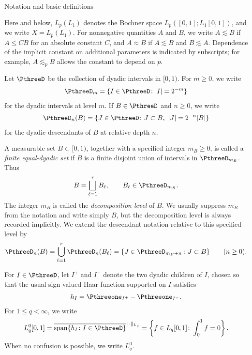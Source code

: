 \documentclass[11pt,reqno]{amsart}
\makeatletter
\theoremstyle{plain}
\theoremstyle{definition}
\newcounter{problempaper}
\newenvironment{problempaperbody}{%
  \setcounter{subsection}{0}%
  \setcounter{subsubsection}{0}%
  \setcounter{paragraph}{0}%
  \renewcommand{\thesubsection}{\arabic{subsection}}%
  \renewcommand{\thesubsubsection}{\thesubsection.\arabic{subsubsection}}%
  \renewcommand{\theparagraph}{\thesubsubsection.\arabic{paragraph}}%
  \let\problem@outersection\section
  \let\problem@outersubsection\subsection
  \let\problem@outersubsubsection\subsubsection
  \let\problem@outerparagraph\paragraph
  \let\section\problem@papersection
  \let\subsection\problem@papersubsection
  \let\subsubsection\problem@papersubsubsection
}{%
  \let\section\problem@outersection
  \let\subsection\problem@outersubsection
  \let\subsubsection\problem@outersubsubsection
  \let\paragraph\problem@outerparagraph
}
\newcommand{\problem@target}[2]{%
  \hypertarget{problem-\theproblempaper-#1-#2}{}%
}
\newcommand{\problem@paperheading}[3]{%
  \par\bigskip
  \problem@target{#1}{#2}%
  \noindent{\large\bfseries #2.\quad #3\par}%
  \nobreak\smallskip
}
\newcommand{\problem@papersubheading}[3]{%
  \par\medskip
  \problem@target{#1}{#2}%
  \noindent{\normalsize\bfseries #2.\quad #3\par}%
  \nobreak\smallskip
}
\newcommand{\problem@papersubsubheading}[3]{%
  \par\smallskip
  \problem@target{#1}{#2}%
  \noindent{\normalsize\itshape #2.\quad #3.\ }%
}
\def\problem@papersection{%
  \@ifstar{\problem@papersectionstar}{\problem@papersectionnostar}%
}
\def\problem@papersectionstar#1{%
  \par\bigskip\noindent{\large\bfseries #1\par}\nobreak\smallskip
}
\def\problem@papersectionnostar#1{%
  \refstepcounter{subsection}%
  \setcounter{subsubsection}{0}%
  \setcounter{paragraph}{0}%
  \problem@paperheading{section}{\thesubsection}{#1}%
  \problem@writecontentsline{section}{\thesubsection}{#1}%
}
\def\problem@papersubsection{%
  \@ifstar{\problem@papersubsectionstar}{\problem@papersubsectionnostar}%
}
\def\problem@papersubsectionstar#1{%
  \par\medskip\noindent{\normalsize\bfseries #1\par}\nobreak\smallskip
}
\def\problem@papersubsectionnostar#1{%
  \refstepcounter{subsubsection}%
  \setcounter{paragraph}{0}%
  \problem@papersubheading{subsection}{\thesubsubsection}{#1}%
  \problem@writecontentsline{subsection}{\thesubsubsection}{#1}%
}
\def\problem@papersubsubsection{%
  \@ifstar{\problem@papersubsubsectionstar}{\problem@papersubsubsectionnostar}%
}
\def\problem@papersubsubsectionstar#1{%
  \par\smallskip\noindent{\normalsize\itshape #1.\ }%
}
\def\problem@papersubsubsectionnostar#1{%
  \refstepcounter{paragraph}%
  \problem@papersubsubheading{subsubsection}{\theparagraph}{#1}%
  \problem@writecontentsline{subsubsection}{\theparagraph}{#1}%
}
\newcommand{\problem@writecontentsline}[3]{%
  \begingroup
  \protected@write\@auxout{}{%
    \string\problemcontentsentry{\theproblempaper}{#1}{#2}{#3}{\thepage}%
  }%
  \endgroup
}
\newcommand{\problemcontentsentry}[5]{%
  \@ifundefined{problemcontents@#1}{%
    \expandafter\gdef\csname problemcontents@#1\endcsname{}%
  }{}%
  \expandafter\g@addto@macro\csname problemcontents@#1\endcsname{%
    \problemcontentsline{#1}{#2}{#3}{#4}{#5}%
  }%
}
\newcommand{\problemcontentslink}[4]{%
  \hyperlink{problem-#1-#2-#3}{#4}%
}
\newcommand{\problemcontentsline}[5]{%
  \ifstrequal{#2}{section}{%
    \par\noindent
    \problemcontentslink{#1}{#2}{#3}{\makebox[2.5em][l]{#3}#4}%
    \nobreak\dotfill
    \problemcontentslink{#1}{#2}{#3}{#5}\par
  }{%
    \ifstrequal{#2}{subsection}{%
      \par\noindent\hspace*{1.5em}%
      \problemcontentslink{#1}{#2}{#3}{\makebox[3.5em][l]{#3}#4}%
      \nobreak\dotfill
      \problemcontentslink{#1}{#2}{#3}{#5}\par
    }{%
      \par\noindent\hspace*{3em}%
      \problemcontentslink{#1}{#2}{#3}{\makebox[4.5em][l]{#3}#4}%
      \nobreak\dotfill
      \problemcontentslink{#1}{#2}{#3}{#5}\par
    }%
  }%
}
\makeatother
\begin{document}
\begin{problempaperbody}
\subsection{Notation and basic definitions}
\label{p3:sec:notation}

Here and below, $L_p(L_1)$ denotes the Bochner space $L_p([0,1];L_1[0,1])$, and we write $X=L_p(L_1)$. For nonnegative quantities $A$ and $B$, we write $A\lesssim B$ if $A\leq CB$ for an absolute constant $C$, and $A\approx B$ if $A\lesssim B$ and $B\lesssim A$. Dependence of the implicit constant on additional parameters is indicated by subscripts; for example, $A\lesssim_p B$ allows the constant to depend on $p$.

Let $\PthreeD$ be the collection of dyadic intervals in $[0,1)$. For $m\geq 0$, we write
\begin{equation*}
        \PthreeD_m=\{I\in\PthreeD\colon |I|=2^{-m}\}
\end{equation*}
for the dyadic intervals at level $m$. If $B\in\PthreeD$ and $n\geq 0$, we write
\begin{equation*}
        \PthreeD_n(B)=\{J\in\PthreeD\colon J\subset B,\ |J|=2^{-n}|B|\}
\end{equation*}
for the dyadic descendants of $B$ at relative depth $n$.

A measurable set $B\subset[0,1)$, together with a specified integer $m_B\geq 0$, is called a \emph{finite equal-dyadic set} if $B$ is a finite disjoint union of intervals in $\PthreeD_{m_B}$. Thus
\begin{equation*}
        B=\bigsqcup_{\ell=1}^r B_\ell,\qquad B_\ell\in\PthreeD_{m_B}.
\end{equation*}
The integer $m_B$ is called the \emph{decomposition level} of $B$. We usually suppress $m_B$ from the notation and write simply $B$, but the decomposition level is always recorded implicitly. We extend the descendant notation relative to this specified level by
\begin{equation*}
        \PthreeD_n(B)=\bigcup_{\ell=1}^r\PthreeD_n(B_\ell)=\{J\in\PthreeD_{m_B+n}:J\subset B\}\qquad(n\geq 0).
\end{equation*}
 
For $I\in\PthreeD$, let $I^+$ and $I^-$ denote the two dyadic children of $I$, chosen so that the usual sign-valued Haar function supported on $I$ satisfies
\begin{equation*}
        h_I=\Pthreeone_{I^+}-\Pthreeone_{I^-}.
\end{equation*}
For $1\leq q<\infty$, we write
\begin{equation*}
        L_q^0[0,1]=\overline{\operatorname{span}\{h_I\colon I\in\PthreeD\}}^{\|\cdot\|_{L_q}}=\left\{f\in L_q[0,1]\colon \int_0^1 f=0\right\}.
\end{equation*}
When no confusion is possible, we write $L_q^0$.


\end{problempaperbody}
\end{document}
